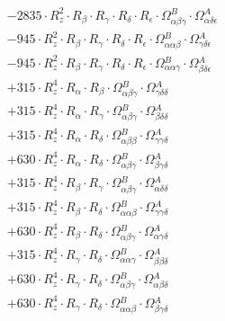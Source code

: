 \documentclass{article}
\begin{document}
\begin{subequations}
\begin{gather}
\begin{array}{c}
 \\[0.2em] 		 - 2835 \cdot R_{z}^{2} \cdot R_{\beta{}} \cdot R_{\gamma{}} \cdot R_{\delta{}} \cdot R_{\epsilon{}} \cdot \Omega{}^{B}_{\alpha{}\beta{}\gamma{}} \cdot \Omega{}^{A}_{\alpha{}\delta{}\epsilon{}} 
 \\[0.2em] 		 - 945 \cdot R_{z}^{2} \cdot R_{\beta{}} \cdot R_{\gamma{}} \cdot R_{\delta{}} \cdot R_{\epsilon{}} \cdot \Omega{}^{B}_{\alpha{}\alpha{}\beta{}} \cdot \Omega{}^{A}_{\gamma{}\delta{}\epsilon{}} 
 \\[0.2em] 		 - 945 \cdot R_{z}^{2} \cdot R_{\beta{}} \cdot R_{\gamma{}} \cdot R_{\delta{}} \cdot R_{\epsilon{}} \cdot \Omega{}^{B}_{\alpha{}\alpha{}\gamma{}} \cdot \Omega{}^{A}_{\beta{}\delta{}\epsilon{}} 
 \\[0.2em] 		 + 315 \cdot R_{z}^{4} \cdot R_{\alpha{}} \cdot R_{\beta{}} \cdot \Omega{}^{B}_{\alpha{}\beta{}\gamma{}} \cdot \Omega{}^{A}_{\gamma{}\delta{}\delta{}} 
 \\[0.2em] 		 + 315 \cdot R_{z}^{4} \cdot R_{\alpha{}} \cdot R_{\gamma{}} \cdot \Omega{}^{B}_{\alpha{}\beta{}\gamma{}} \cdot \Omega{}^{A}_{\beta{}\delta{}\delta{}} 
 \\[0.2em] 		 + 315 \cdot R_{z}^{4} \cdot R_{\alpha{}} \cdot R_{\delta{}} \cdot \Omega{}^{B}_{\alpha{}\beta{}\beta{}} \cdot \Omega{}^{A}_{\gamma{}\gamma{}\delta{}} 
 \\[0.2em] 		 + 630 \cdot R_{z}^{4} \cdot R_{\alpha{}} \cdot R_{\delta{}} \cdot \Omega{}^{B}_{\alpha{}\beta{}\gamma{}} \cdot \Omega{}^{A}_{\beta{}\gamma{}\delta{}} 
 \\[0.2em] 		 + 315 \cdot R_{z}^{4} \cdot R_{\beta{}} \cdot R_{\gamma{}} \cdot \Omega{}^{B}_{\alpha{}\beta{}\gamma{}} \cdot \Omega{}^{A}_{\alpha{}\delta{}\delta{}} 
 \\[0.2em] 		 + 315 \cdot R_{z}^{4} \cdot R_{\beta{}} \cdot R_{\delta{}} \cdot \Omega{}^{B}_{\alpha{}\alpha{}\beta{}} \cdot \Omega{}^{A}_{\gamma{}\gamma{}\delta{}} 
 \\[0.2em] 		 + 630 \cdot R_{z}^{4} \cdot R_{\beta{}} \cdot R_{\delta{}} \cdot \Omega{}^{B}_{\alpha{}\beta{}\gamma{}} \cdot \Omega{}^{A}_{\alpha{}\gamma{}\delta{}} 
 \\[0.2em] 		 + 315 \cdot R_{z}^{4} \cdot R_{\gamma{}} \cdot R_{\delta{}} \cdot \Omega{}^{B}_{\alpha{}\alpha{}\gamma{}} \cdot \Omega{}^{A}_{\beta{}\beta{}\delta{}} 
 \\[0.2em] 		 + 630 \cdot R_{z}^{4} \cdot R_{\gamma{}} \cdot R_{\delta{}} \cdot \Omega{}^{B}_{\alpha{}\beta{}\gamma{}} \cdot \Omega{}^{A}_{\alpha{}\beta{}\delta{}} 
 \\[0.2em] 		 + 630 \cdot R_{z}^{4} \cdot R_{\gamma{}} \cdot R_{\delta{}} \cdot \Omega{}^{B}_{\alpha{}\alpha{}\beta{}} \cdot \Omega{}^{A}_{\beta{}\gamma{}\delta{}} 

\end{array}
\end{gather}
\end{subequations}
\end{document}
